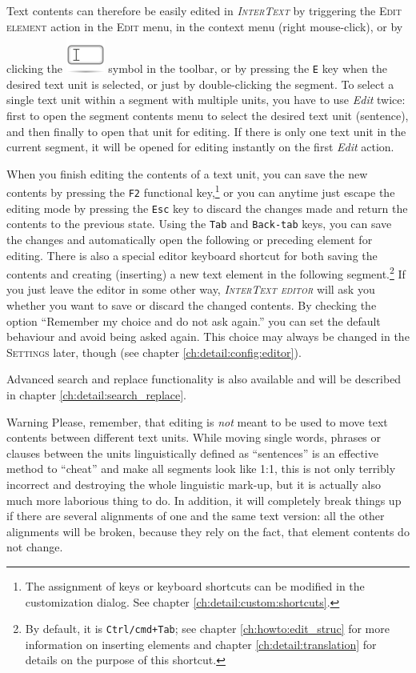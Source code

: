 \documentclass[a4paper,10pt,oneside]{book}
\newcommand{\IT}{\textit{\textsc{InterText}}\xspace}
\newcommand{\ITeditor}{\textit{\textsc{InterText editor}}\xspace}
\newcommand{\keys}[1]{\texttt{#1}}
\newcommand{\menu}[1]{\textsc{#1}}
\begin{document}
Text contents can therefore be easily edited in \IT by triggering the \menu{Edit element} action in the \menu{Edit} menu, in the context menu (right mouse-click), or by clicking the \includegraphics[height=2ex]{../images/48/edit-rename.png} symbol in the toolbar, or by pressing the \keys{E} key when the desired text unit is selected, or just by double-clicking the segment. To select a single text unit within a segment with multiple units, you have to use \emph{Edit} twice: first to open the segment contents menu to select the desired text unit (sentence), and then finally to open that unit for editing. If there is only one text unit in the current segment, it will be opened for editing instantly on the first \emph{Edit} action.

When you finish editing the contents of a text unit, you can save the new contents by pressing the \keys{F2} functional key,\footnote{The assignment of keys or keyboard shortcuts can be modified in the customization dialog. See chapter \ref{ch:detail:custom:shortcuts}.} or you can anytime just escape the editing mode by pressing the \keys{Esc} key to discard the changes made and return the contents to the previous state. Using the \keys{Tab} and \keys{Back-tab} keys, you can save the changes and automatically open the following or preceding element for editing. There is also a special editor keyboard shortcut for both saving the contents and creating (inserting) a new text element in the following segment.\footnote{By default, it is \keys{Ctrl/cmd+Tab}; see chapter \ref{ch:howto:edit_struc} for more information on inserting elements and chapter \ref{ch:detail:translation} for details on the purpose of this shortcut.} If you just leave the editor in some other way, \ITeditor will ask you whether you want to save or discard the changed contents. By checking the option ``Remember my choice and do not ask again.'' you can set the default behaviour and avoid being asked again. This choice may always be changed in the \menu{Settings} later, though (see chapter \ref{ch:detail:config:editor}).

Advanced search and replace functionality is also available and will be described in chapter \ref{ch:detail:search_replace}.

\medskip
\begin{bclogo}[couleur = blue!30, arrondi = 0.1, logo = \bcattention,
ombre = true , epOmbre = 0.125, couleurOmbre = black!30, blur, epBord = 0.3, marge = 5]{Warning}\small
Please, remember, that editing is \emph{not} meant to be used to move text contents between different text units. While moving single words, phrases or clauses between the units linguistically defined as ``sentences'' is an effective method to ``cheat'' and make all segments look like 1:1, this is not only terribly incorrect and destroying the whole linguistic mark-up, but it is actually also much more laborious thing to do. In addition, it will completely break things up if there are several alignments of one and the same text version: all the other alignments will be broken, because they rely on the fact, that element contents do not change.
\end{bclogo}
\end{document}
